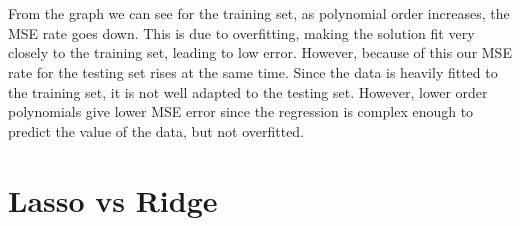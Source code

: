 \documentclass[paper=a4, fontsize=11pt]{scrartcl} %
\numberwithin{equation}{section} %
\numberwithin{figure}{section} %
\numberwithin{table}{section} %
\begin{document}
	\\\\
	From the graph we can see for the training set, as polynomial order increases, the MSE rate goes down. This is due to overfitting, making the solution fit very closely to the training set, leading to low error. However, because of this our MSE rate for the testing set rises at the same time. Since the data is heavily fitted to the training set, it is not well adapted to the testing set. However, lower order polynomials give lower MSE error since the regression is complex enough to predict the value of the data, but not overfitted.
	\newpage
	\section{Lasso vs Ridge}
	
\end{document}
